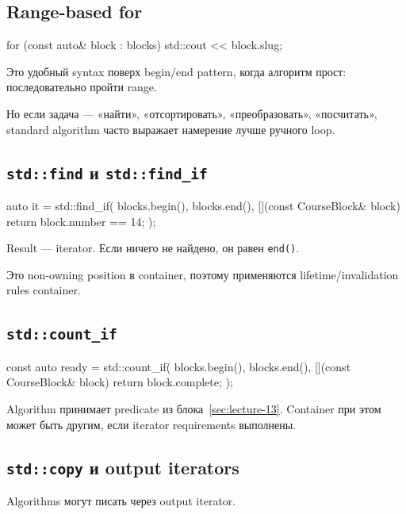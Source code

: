 \subsection{Range-based for}

\begin{cppcode}
for (const auto& block : blocks) {
    std::cout << block.slug;
}
\end{cppcode}

Это удобный syntax поверх begin/end pattern, когда алгоритм прост:
последовательно пройти range.

Но если задача --- «найти», «отсортировать», «преобразовать», «посчитать»,
standard algorithm часто выражает намерение лучше ручного loop.

\subsection{\texttt{std::find} и \texttt{std::find\_if}}

\begin{cppcode}
auto it = std::find_if(
    blocks.begin(),
    blocks.end(),
    [](const CourseBlock& block) {
        return block.number == 14;
    }
);
\end{cppcode}

Result --- iterator. Если ничего не найдено, он равен \texttt{end()}.

Это non-owning position в container, поэтому применяются lifetime/invalidation
rules container.

\subsection{\texttt{std::count\_if}}

\begin{cppcode}
const auto ready = std::count_if(
    blocks.begin(),
    blocks.end(),
    [](const CourseBlock& block) {
        return block.complete;
    }
);
\end{cppcode}

Algorithm принимает predicate из блока~\ref{sec:lecture-13}. Container при этом
может быть другим, если iterator requirements выполнены.

\subsection{\texttt{std::copy} и output iterators}

Algorithms могут писать через output iterator.

